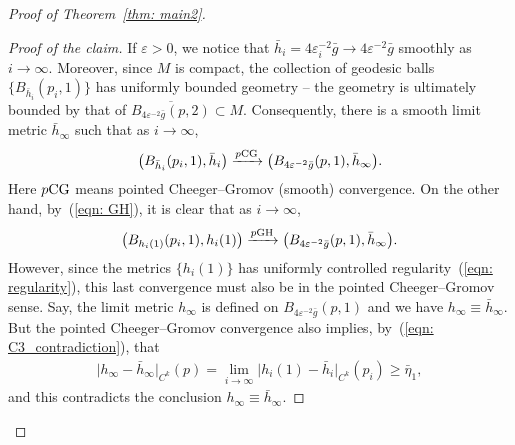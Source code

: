 \documentclass[pdftex]{sigma}
\numberwithin{equation}{section}
\begin{document}
\begin{proof}[Proof of Theorem~\ref{thm: main2}]
\begin{proof}[Proof of the claim]
If $\varepsilon>0$, we notice that
$\bar{h}_i=4\varepsilon_i^{-2}\bar{g}\to 4\varepsilon^{-2}\bar{g}$ smoothly as
$i\to\infty$. Moreover, since $M$ is compact, the collection of geodesic balls
$ \{B_{\bar{h}_i}(p_i,1) \}$ has uniformly bounded geometry -- the
geometry is ultimately bounded by that of
$\overline{B_{4\varepsilon^{-2}\bar{g}}(p,2)}\subset M$. Consequently, there is
a smooth limit metric $\bar{h}_{\infty}$ such that as $i\to \infty$,
\begin{align*}
\big(B_{\bar{h}_i}(p_i,1),\bar{h}_i\big) \xrightarrow{p{\rm CG}}
\big(B_{4\varepsilon^{-2}\bar{g}}(p,1),\bar{h}_{\infty}\big).
\end{align*}
Here $p{\rm CG}$ means pointed Cheeger--Gromov (smooth) convergence. On the other hand,
by~(\ref{eqn: GH}), it is clear that as $i\to \infty$,
\begin{align*}
\big(B_{h_i(1)}(p_i,1),h_i(1)\big) \xrightarrow{p{\rm GH}}
\big(B_{4\varepsilon^{-2}\bar{g}}(p,1), \bar{h}_{\infty}\big).
\end{align*}
However, since the metrics $\{h_i(1)\}$ has uniformly controlled regularity~(\ref{eqn: regularity}), this last convergence must also be in the pointed
Cheeger--Gromov sense. Say, the limit metric $h_{\infty}$ is defined on
$B_{4\varepsilon^{-2}\bar{g}}(p,1)$ and we have $h_{\infty}\equiv
\bar{h}_{\infty}$. But the pointed Cheeger--Gromov convergence also implies, by~(\ref{eqn: C3_contradiction}), that{\samepage
\begin{align*}
 \big|h_{\infty}-\bar{h}_{\infty} \big|_{C^k}(p) = \lim_{i\to\infty}
 \big|h_i(1)-\bar{h}_i \big|_{C^k}(p_i) \ge \bar{\eta}_1,
\end{align*}
and this contradicts the conclusion $h_{\infty}\equiv \bar{h}_{\infty}$.}


\end{proof}
\end{proof}
\end{document}
